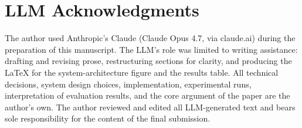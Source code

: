 \documentclass{article}
\begin{document}
\section*{LLM Acknowledgments}

The author used Anthropic's Claude (Claude Opus 4.7, via claude.ai) during the preparation of this manuscript. The LLM's role was limited to writing assistance: drafting and revising prose, restructuring sections for clarity, and producing the LaTeX for the system-architecture figure and the results table. All technical decisions, system design choices, implementation, experimental runs, interpretation of evaluation results, and the core argument of the paper are the author's own. The author reviewed and edited all LLM-generated text and bears sole responsibility for the content of the final submission.
\end{document}
